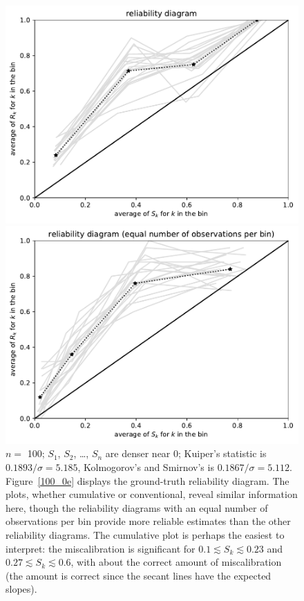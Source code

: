 \documentclass{article}
\begin{document}
\begin{figure}
\begin{centering}
\parbox{\imsize}{\includegraphics[width=\imsize]
                {./codes/unweighted/100_4_1_2/equiprob.pdf}}
\quad\quad
\parbox{\imsize}{\includegraphics[width=\imsize]
                {./codes/unweighted/100_4_1_2/equisamp.pdf}}

\end{centering}
\caption{$n =$ 100; $S_1$, $S_2$, \dots, $S_n$ are denser near 0;
         Kuiper's statistic is $0.1893 / \sigma = 5.185$,
         Kolmogorov's and Smirnov's is $0.1867 / \sigma = 5.112$.
Figure~\ref{100_0e} displays the ground-truth reliability diagram.
The plots, whether cumulative or conventional, reveal similar information here,
though the reliability diagrams with an equal number of observations per bin
provide more reliable estimates than the other reliability diagrams.
The cumulative plot is perhaps the easiest to interpret:
the miscalibration is significant for $0.1 \lesssim S_k \lesssim 0.23$
and $0.27 \lesssim S_k \lesssim 0.6$,
with about the correct amount of miscalibration
(the amount is correct since the secant lines have the expected slopes).
}
\label{100_0}
\end{figure}
\end{document}
